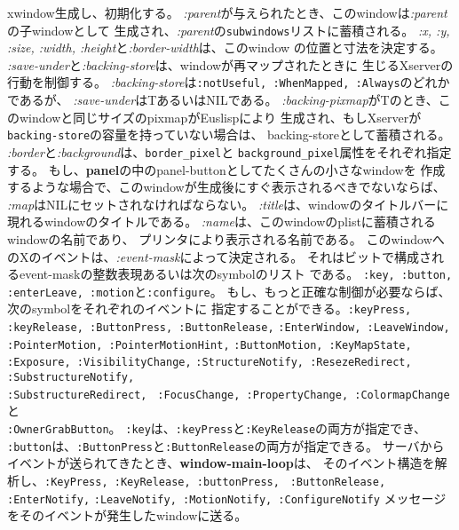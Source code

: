 \begin{refdesc}
\longdescription{:create}{\&key ( \= (:parent *root*) \` [メソッド] \\
\> (:x 0) (:y 0) (:size 256) (:width size) (:height size) (:border-width 2) \\
\> (:save-under nil) (:backing-store :always) (:backing-pixmap nil)\\
\> (:border *fg-pixel*) (:background *bg-pixel*) \\
\> (:map T) (:gravity :northwest) \\
\> (:title "WINDOW") (:name title) \\
\> (:font) \\
\> :event-mask (:key :button :enterLeave :configure :motion)}
{xwindow生成し、初期化する。
{\em :parent}が与えられたとき、このwindowは{\em :parent}の子windowとして
生成され、{\em :parent}の{\tt subwindows}リストに蓄積される。
{\em :x, :y, :size, :width, :height}と{\em :border-width}は、このwindow
の位置と寸法を決定する。
{\em :save-under}と{\em :backing-store}は、windowが再マップされたときに
生じるXserverの行動を制御する。
{\em :backing-store}は{\tt :notUseful, :WhenMapped, :Always}のどれかであるが、
{\em :save-under}はTあるいはNILである。
{\em :backing-pixmap}がTのとき、このwindowと同じサイズのpixmapがEuslispにより
生成され、もしXserverが{\tt backing-store}の容量を持っていない場合は、
backing-storeとして蓄積される。
{\em :border}と{\em :background}は、{\tt border\_pixel}と
{\tt background\_pixel}属性をそれぞれ指定する。
もし、{\bf panel}の中のpanel-buttonとしてたくさんの小さなwindowを
作成するような場合で、このwindowが生成後にすぐ表示されるべきでないならば、
{\em :map}はNILにセットされなければならない。
{\em :title}は、windowのタイトルバーに現れるwindowのタイトルである。
{\em :name}は、このwindowのplistに蓄積されるwindowの名前であり、
プリンタにより表示される名前である。
このwindowへのXのイベントは、{\em :event-mask}によって決定される。
それはビットで構成されるevent-maskの整数表現あるいは次のsymbolのリスト
である。
{\tt :key, :button, :enterLeave, :motion}と{\tt :configure}。
もし、もっと正確な制御が必要ならば、次のsymbolをそれぞれのイベントに
指定することができる。{\tt :keyPress, :keyRelease, :ButtonPress, :ButtonRelease,} 
{\tt :EnterWindow, :LeaveWindow, :PointerMotion, :PointerMotionHint,} 
{\tt :ButtonMotion, :KeyMapState,\\ :Exposure, :VisibilityChange,}
 {\tt :StructureNotify,
:ResezeRedirect, :SubstructureNotify,\\ :SubstructureRedirect,} {\tt
:FocusChange, :PropertyChange, :ColormapChange}と\\{\tt :OwnerGrabButton}。
{\tt :key}は、{\tt :keyPress}と{\tt :KeyRelease}の両方が指定でき、
{\tt :button}は、{\tt :ButtonPress}と{\tt :ButtonRelease}の両方が指定できる。
サーバからイベントが送られてきたとき、{\bf window-main-loop}は、
そのイベント構造を解析し、{\tt :KeyPress, :KeyRelease, :buttonPress,} {\tt
:ButtonRelease, :EnterNotify,} {\tt :LeaveNotify, :MotionNotify, :ConfigureNotify}
メッセージをそのイベントが発生したwindowに送る。}


\end{refdesc}
